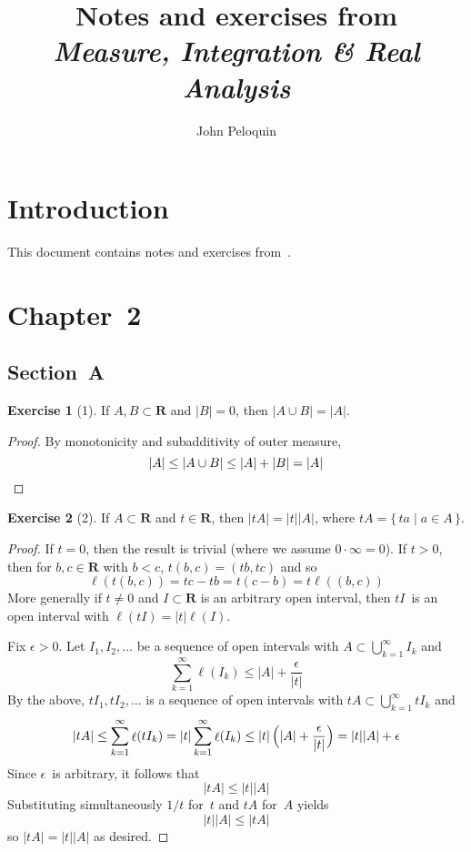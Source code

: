 \documentclass[letterpaper,12pt]{article}
\title{Notes and exercises from\\\emph{Measure, Integration \& Real Analysis}}
\author{John Peloquin}
\date{}
\newcommand{\R}{\mathbf{R}}
\newcommand{\union}{\cup}
\newcommand{\bigunion}{\bigcup}
\newcommand{\mult}{\cdot}
\DeclareMathOperator{\len}{\ell}
\newcommand{\abs}[1]{|#1|}
\renewcommand{\l}[1]{\len(#1)}
\newcommand{\m}[1]{|#1|}
\theoremstyle{definition}
\newtheorem*{exer}{Exercise}
\theoremstyle{remark}
\begin{document}
\maketitle

\section*{Introduction}
This document contains notes and exercises from~\cite{axler}.

\section*{Chapter~2}
\subsection*{Section~A}

\begin{exer}[1]
If \(A,B\subset\R\) and \(\m{B}=0\), then \(\m{A\union B}=\m{A}\).
\end{exer}
\begin{proof}
By monotonicity and subadditivity of outer measure,
\[\m{A}\le\m{A\union B}\le\m{A}+\m{B}=\m{A}\qedhere\]
\end{proof}

\begin{exer}[2]
If \(A\subset\R\) and \(t\in\R\), then \(\m{tA}=\abs{t}\m{A}\), where \(tA=\{\,ta\mid a\in A\,\}\).
\end{exer}
\begin{proof}
If \(t=0\), then the result is trivial (where we assume \(0\mult\infty=0\)). If \(t>0\), then for \(b,c\in\R\) with \(b<c\), \(t(b,c)=(tb,tc)\) and so
\[\l{t(b,c)}=tc-tb=t(c-b)=t\l{(b,c)}\]
More generally if \(t\ne0\) and \(I\subset\R\) is an arbitrary open interval, then \(tI\)~is an open interval with \(\l{tI}=\abs{t}\l{I}\).

Fix \(\epsilon>0\). Let \(I_1,I_2,\ldots\) be a sequence of open intervals with \(A\subset\bigunion_{k=1}^{\infty}I_k\) and
\[\sum_{k=1}^{\infty}\l{I_k}\le\m{A}+\frac{\epsilon}{\abs{t}}\]
By the above, \(tI_1,tI_2,\ldots\) is a sequence of open intervals with \(tA\subset\bigunion_{k=1}^{\infty}tI_k\) and
\[\m{tA}\le\sum_{k=1}^{\infty}\l{tI_k}=\abs{t}\sum_{k=1}^{\infty}\l{I_k}\le\abs{t}\,\Bigl(\m{A}+\frac{\epsilon}{\abs{t}}\Bigr)=\abs{t}\m{A}+\epsilon\]
Since \(\epsilon\)~is arbitrary, it follows that
\[\m{tA}\le\abs{t}\m{A}\]
Substituting simultaneously \(1/t\) for~\(t\) and \(tA\) for~\(A\) yields
\[\abs{t}\m{A}\le\m{tA}\]
so \(\m{tA}=\abs{t}\m{A}\) as desired.
\end{proof}
\end{document}

